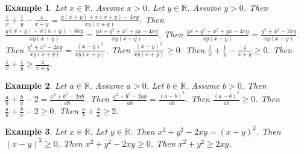 \documentclass[12pt]{article}
\newtheorem{example}{Example}
\begin{document}
\begin{example}
    Let $x\in\mathbb{R}$. Assume $x>0$.
    Let $y\in\mathbb{R}$. Assume $y>0$.
    Then $\frac{1}{x} + \frac{1}{y} - \frac{4}{x+y} = \frac{y(x+y) + x(x+y) - 4xy}{xy(x+y)}$.
    Then $\frac{y(x+y) + x(x+y) - 4xy}{xy(x+y)} = \frac{yx + y^2 + x^2 + yx - 4xy}{xy(x+y)}$.
    Then $\frac{yx + y^2 + x^2 + yx - 4xy}{xy(x+y)} = \frac{y^2 + x^2 -2xy}{xy(x+y)}$. %
    Then $\frac{y^2 + x^2 -2xy}{xy(x+y)} = \frac{{(x-y)}^2}{xy(x+y)}$.
    Then $\frac{{(x-y)}^2}{xy(x+y)} \ge 0$.
    Then $\frac{1}{x} + \frac{1}{y} - \frac{4}{x+y} \ge 0$.
    Then $\frac{1}{x} + \frac{1}{y} \ge \frac{4}{x+y}$.
\end{example}

\begin{example}
    Let $a\in\mathbb{R}$. Assume $a > 0$.
    Let $b\in\mathbb{R}$. Assume $b > 0$.
    Then $\frac{a}{b} + \frac{b}{a} - 2 = \frac{a^2 + b^2 - 2ab}{ab}$.
    Then $\frac{a^2 + b^2 - 2ab}{ab} = \frac{{(a-b)}^2}{ab}$.
    Then $\frac{{(a-b)}^2}{ab} \ge 0$.
    Then $\frac{a}{b} + \frac{b}{a} - 2 \ge 0$.
    Then $\frac{a}{b} + \frac{b}{a} \ge 2$.
\end{example}

\begin{example}
    Let $x\in\mathbb{R}$. Let $y\in\mathbb{R}$.
    Then $x^2 + y^2 - 2xy = {(x-y)}^2$.
    Then ${(x-y)}^2 \ge 0$.
    Then $x^2 + y^2 - 2xy \ge 0$.
    Then $x^2 + y^2 \ge 2xy$.
\end{example}
\end{document}
